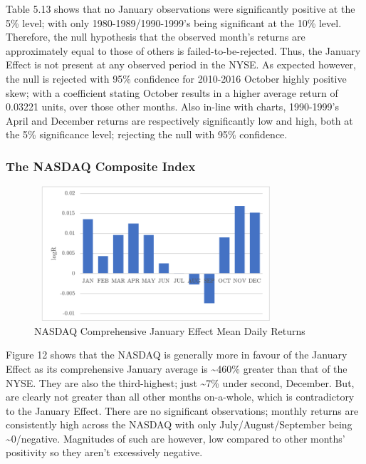 \documentclass[11pt, english]{article}
\begin{document}
	Table 5.13 shows that no January observations were significantly positive at the 5\% level; with only 1980-1989/1990-1999’s being significant at the 10\% level. Therefore, the null hypothesis that the observed month’s returns are approximately equal to those of others is failed-to-be-rejected. Thus, the January Effect is not present at any observed period in the NYSE. As expected however, the null is rejected with 95\% confidence for 2010-2016 October highly positive skew; with a coefficient stating October results in a higher average return of 0.03221 units, over those other months. Also in-line with charts, 1990-1999’s April and December returns are respectively significantly low and high, both at the 5\% significance level; rejecting the null with 95\% confidence.
	
		\subsubsection{The NASDAQ Composite Index}

	\begin{figure}[H]
        \begin{center}
                \includegraphics[width=9cm,height=5cm]{NAS-JE1.png} 
                \caption{NASDAQ Comprehensive January Effect Mean Daily Returns}
        \end{center}
        \end{figure}

	Figure 12 shows that the NASDAQ is generally more in favour of the January Effect as its comprehensive January average is \~{}460\% greater than that of the NYSE. They are also the third-highest; just \~{}7\% under second, December. But, are clearly not greater than all other months on-a-whole, which is contradictory to the January Effect. There are no significant observations; monthly returns are consistently high across the NASDAQ with only July/August/September being \~{}0/negative. Magnitudes of such are however, low compared to other months' positivity so they aren’t excessively negative.
\end{document}

